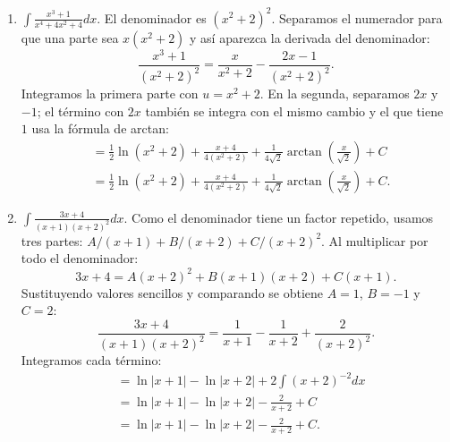 \documentclass[12pt, letterpaper]{article}
\makeatletter
\renewcommand{\alph}[1]{\expandafter\@alphlatin\csname c@#1\endcsname}
\newcommand{\@alphlatin}[1]{\ifcase#1\or a\or b\or c\or d\or e\or f\or g\or h\or i\or j\or k\or l\or m\or n\or o\or p\or q\or r\or s\or t\or u\or v\or w\or x\or y\or z\else\@ctrerr\fi}
\makeatother
\begin{document}
\begin{enumerate}[label=\alph*)]
  \[
  \begin{aligned}
  &=\frac12\ln(x^2+1)+\arctan x-\frac12\ln(x^2+2)-\frac1{\sqrt2}\arctan\left(\frac{x}{\sqrt2}\right)+C\\
  &=\boxed{\frac12\ln(x^2+1)+\arctan x-\frac12\ln(x^2+2)-\frac1{\sqrt2}\arctan\left(\frac{x}{\sqrt2}\right)+C}.
  \end{aligned}
  \]
  \item $\displaystyle\int\frac{x^3+1}{x^4+4x^2+4}dx$. El denominador es $(x^2+2)^2$. Separamos el numerador para que una parte sea $x(x^2+2)$ y así aparezca la derivada del denominador:
  \[
  \frac{x^3+1}{(x^2+2)^2}=\frac{x}{x^2+2}-\frac{2x-1}{(x^2+2)^2}.
  \]
  Integramos la primera parte con $u=x^2+2$. En la segunda, separamos $2x$ y $-1$; el término con $2x$ también se integra con el mismo cambio y el que tiene $1$ usa la fórmula de arctan:
  \[
  \begin{aligned}
  &=\frac12\ln(x^2+2)+\frac{x+4}{4(x^2+2)}+\frac1{4\sqrt2}\arctan\left(\frac{x}{\sqrt2}\right)+C\\
  &=\boxed{\frac12\ln(x^2+2)+\frac{x+4}{4(x^2+2)}+\frac1{4\sqrt2}\arctan\left(\frac{x}{\sqrt2}\right)+C}.
  \end{aligned}
  \]
  \item $\displaystyle\int\frac{3x+4}{(x+1)(x+2)^2}dx$. Como el denominador tiene un factor repetido, usamos tres partes: $A/(x+1)+B/(x+2)+C/(x+2)^2$. Al multiplicar por todo el denominador:
  \[
  3x+4=A(x+2)^2+B(x+1)(x+2)+C(x+1).
  \]
  Sustituyendo valores sencillos y comparando se obtiene $A=1$, $B=-1$ y $C=2$:
  \[
  \frac{3x+4}{(x+1)(x+2)^2}=\frac1{x+1}-\frac1{x+2}+\frac2{(x+2)^2}.
  \]
  Integramos cada término:
  \[
  \begin{aligned}
  &=\ln|x+1|-\ln|x+2|+2\int(x+2)^{-2}dx\\
  &=\ln|x+1|-\ln|x+2|-\frac2{x+2}+C\\
  &=\boxed{\ln|x+1|-\ln|x+2|-\frac2{x+2}+C}.
  \end{aligned}
  \]
\end{enumerate}
\end{document}
